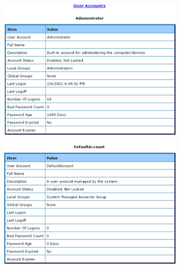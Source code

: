 \begin{figure}[H]
    \centering
    \begin{subfigure}[b]{0.49\textwidth}
        \centering
        \includegraphics[width=\textwidth]{figures/pic3.png}
    \end{subfigure}
    \begin{subfigure}[b]{0.49\textwidth}
        \centering
        \includegraphics[width=\textwidth]{figures/pic4.png}
    \end{subfigure}
    \\
    \begin{subfigure}[b]{0.5\textwidth}
        \centering

\end{subfigure}
\end{figure}
